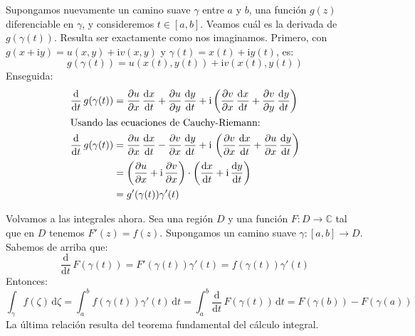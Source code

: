  Supongamos nuevamente
  un camino suave \(\gamma\) entre \(a\) y \(b\),
  una función \(g(z)\) diferenciable en \(\gamma\),
  y consideremos \(t \in [a, b]\).
  Veamos cuál es la derivada de \(g(\gamma(t))\).
  Resulta ser exactamente como nos imaginamos.
  Primero,
  con \(g(x + \mathrm{i} y) = u(x, y) + \mathrm{i} v(x, y)\)
  y \(\gamma(t) = x(t) + \mathrm{i} y(t)\),
  es:
  \begin{equation*}
    g(\gamma(t))
      = u(x(t), y(t)) + \mathrm{i} v(x(t), y(t))
  \end{equation*}
  Enseguida:
  \begin{align*}
    \frac{\mathrm{d}}{\mathrm{d} t} \, g(\gamma(t))
      &= \frac{\partial u}{\partial x} \,
	    \frac{\mathrm{d} x}{\mathrm{d} t}
	    + \frac{\partial u}{\partial y} \,
		\frac{\mathrm{d} y}{\mathrm{d} t}
	  + \mathrm{i}
	      \left(
		\frac{\partial v}{\partial x} \,
		  \frac{\mathrm{d} x}{\mathrm{d} t}
		  + \frac{\partial v}{\partial y} \,
		      \frac{\mathrm{d} y}{\mathrm{d} t}
	      \right) \\
  \intertext{Usando las ecuaciones de Cauchy-Riemann:%
	       \index{Cauchy-Riemann, ecuaciones de}}
    \frac{\mathrm{d}}{\mathrm{d} t} \, g(\gamma(t))
      &= \frac{\partial u}{\partial x} \,
	   \frac{\mathrm{d} x}{\mathrm{d} t}
	     - \frac{\partial v}{\partial x} \,
		 \frac{\mathrm{d} y}{\mathrm{d} t}
	   + \mathrm{i} \,
	       \left(
		\frac{\partial v}{\partial x} \,
		  \frac{\mathrm{d} x}{\mathrm{d} t}
		  + \frac{\partial u}{\partial x} \,
		      \frac{\mathrm{d} y}{\mathrm{d} t}
	       \right) \\
      &= \left(
	   \frac{\partial u}{\partial x}
	     + \mathrm{i} \, \frac{\partial v}{\partial x}
	 \right)
	   \cdot \left(
		   \frac{\mathrm{d} x}{\mathrm{d} t}
		     + \mathrm{i} \, \frac{\mathrm{d} y}
					  {\mathrm{d} t}
		 \right) \\
      &= g'(\gamma(t)) \gamma'(t)
  \end{align*}

  Volvamos a las integrales ahora.
  Sea una región \(D\)
  y una función \(F \colon D \rightarrow \mathbb{C}\)
  tal que en \(D\) tenemos \(F'(z) = f(z)\).
  Supongamos un camino suave \(\gamma \colon [a, b] \rightarrow D\).
  Sabemos de arriba que:
  \begin{equation*}
    \frac{\mathrm{d}}{\mathrm{d} t} \, F(\gamma(t))
      = F'(\gamma(t)) \gamma'(t)
      = f(\gamma(t)) \gamma'(t)
  \end{equation*}
  Entonces:
  \begin{equation}
    \label{eq:complex-integral-antiderivative}
    \int_\gamma f(\zeta) \, \mathrm{d} \zeta
      = \int_a^b f(\gamma(t)) \gamma'(t) \, \mathrm{d} t
      = \int_a^b \frac{\mathrm{d}}{\mathrm{d} t} \, F(\gamma(t))
	  \, \mathrm{d} t
      = F(\gamma(b)) - F(\gamma(a))
  \end{equation}
  La última relación
  resulta del teorema fundamental del cálculo integral.

